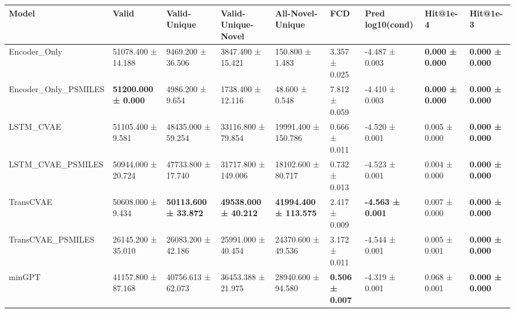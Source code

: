 \begin{tabular}{lllllllll}
\toprule
Model & Valid & Valid-Unique & Valid-Unique-Novel & All-Novel-Unique & FCD & Pred log10(cond) & Hit@1e-4 & Hit@1e-3 \\
\midrule
Encoder_Only & 51078.400 ± 14.188 & 9469.200 ± 36.506 & 3847.400 ± 15.421 & 150.800 ± 1.483 & 3.357 ± 0.025 & -4.487 ± 0.003 & \textbf{0.000 ± 0.000} & \textbf{0.000 ± 0.000} \\
Encoder_Only_PSMILES & \textbf{51200.000 ± 0.000} & 4986.200 ± 9.654 & 1738.400 ± 12.116 & 48.600 ± 0.548 & 7.812 ± 0.059 & -4.410 ± 0.003 & \textbf{0.000 ± 0.000} & \textbf{0.000 ± 0.000} \\
LSTM_CVAE & 51105.400 ± 9.581 & 48435.000 ± 59.254 & 33116.800 ± 79.854 & 19991.400 ± 150.786 & 0.666 ± 0.011 & -4.520 ± 0.001 & 0.005 ± 0.000 & \textbf{0.000 ± 0.000} \\
LSTM_CVAE_PSMILES & 50944.000 ± 20.724 & 47733.800 ± 17.740 & 31717.800 ± 149.006 & 18102.600 ± 80.717 & 0.732 ± 0.013 & -4.523 ± 0.001 & 0.004 ± 0.000 & \textbf{0.000 ± 0.000} \\
TransCVAE & 50608.000 ± 9.434 & \textbf{50113.600 ± 33.872} & \textbf{49538.000 ± 40.212} & \textbf{41994.400 ± 113.575} & 2.417 ± 0.009 & \textbf{-4.563 ± 0.001} & 0.007 ± 0.000 & \textbf{0.000 ± 0.000} \\
TransCVAE_PSMILES & 26145.200 ± 35.010 & 26083.200 ± 42.186 & 25991.000 ± 40.454 & 24370.600 ± 49.536 & 3.172 ± 0.011 & -4.544 ± 0.001 & 0.005 ± 0.001 & \textbf{0.000 ± 0.000} \\
minGPT & 41157.800 ± 87.168 & 40756.613 ± 62.073 & 36453.388 ± 21.975 & 28940.600 ± 94.580 & \textbf{0.506 ± 0.007} & -4.319 ± 0.001 & 0.068 ± 0.001 & \textbf{0.000 ± 0.000} \\
\bottomrule
\end{tabular}
